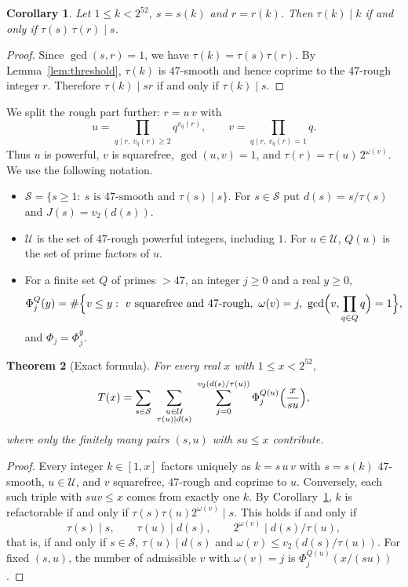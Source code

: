\documentclass[11pt,a4paper]{article}
\newtheorem{theorem}{Theorem}[section]
\newtheorem{corollary}[theorem]{Corollary}
\theoremstyle{definition}
\newcommand{\cS}{\mathcal S}
\newcommand{\cU}{\mathcal U}
\begin{document}
\begin{corollary}\label{cor:criterion}
Let $1\le k<2^{52}$, $s=s(k)$ and $r=r(k)$. Then $\tau(k)\mid k$ if and only if $\tau(s)\,\tau(r)\mid s$.
\end{corollary}

\begin{proof}
Since $\gcd(s,r)=1$, we have $\tau(k)=\tau(s)\tau(r)$. By Lemma~\ref{lem:threshold}, $\tau(k)$ is $47$-smooth and hence coprime to the $47$-rough integer $r$. Therefore $\tau(k)\mid sr$ if and only if $\tau(k)\mid s$.
\end{proof}

We split the rough part further: $r=u\,v$ with
\[
u=\prod_{q\mid r,\ v_q(r)\ge2}q^{v_q(r)},\qquad v=\prod_{q\mid r,\ v_q(r)=1}q .
\]
Thus $u$ is powerful, $v$ is squarefree, $\gcd(u,v)=1$, and $\tau(r)=\tau(u)\,2^{\omega(v)}$. We use the following notation.
\begin{itemize}
\item $\cS=\{s\ge1:\ s \text{ is $47$-smooth and } \tau(s)\mid s\}$. For $s\in\cS$ put $d(s)=s/\tau(s)$ and $J(s)=v_2(d(s))$.
\item $\cU$ is the set of $47$-rough powerful integers, including $1$. For $u\in\cU$, $Q(u)$ is the set of prime factors of $u$.
\item For a finite set $Q$ of primes $>47$, an integer $j\ge0$ and a real $y\ge0$,
\[
\Phi^{Q}_j(y)=\#\Bigl\{v\le y:\ v \text{ squarefree and $47$-rough},\ \omega(v)=j,\ \gcd\Bigl(v,\prod_{q\in Q}q\Bigr)=1\Bigr\},
\]
and $\Phi_j=\Phi_j^{\emptyset}$.
\end{itemize}

\begin{theorem}[Exact formula]\label{thm:exact}
For every real $x$ with $1\le x<2^{52}$,
\begin{equation}\label{eq:exact}
T(x)=\sum_{s\in\cS}\ \sum_{\substack{u\in\cU\\ \tau(u)\mid d(s)}}\ \sum_{j=0}^{v_2(d(s)/\tau(u))}\Phi_j^{Q(u)}\Bigl(\frac{x}{su}\Bigr),
\end{equation}
where only the finitely many pairs $(s,u)$ with $su\le x$ contribute.
\end{theorem}

\begin{proof}
Every integer $k\in[1,x]$ factors uniquely as $k=s\,u\,v$ with $s=s(k)$ $47$-smooth, $u\in\cU$, and $v$ squarefree, $47$-rough and coprime to $u$. Conversely, each such triple with $suv\le x$ comes from exactly one $k$. By Corollary~\ref{cor:criterion}, $k$ is refactorable if and only if $\tau(s)\tau(u)2^{\omega(v)}\mid s$. This holds if and only if
\[
\tau(s)\mid s,\qquad \tau(u)\mid d(s),\qquad 2^{\omega(v)}\mid d(s)/\tau(u),
\]
that is, if and only if $s\in\cS$, $\tau(u)\mid d(s)$ and $\omega(v)\le v_2(d(s)/\tau(u))$. For fixed $(s,u)$, the number of admissible $v$ with $\omega(v)=j$ is $\Phi^{Q(u)}_j(x/(su))$.
\end{proof}
\end{document}

